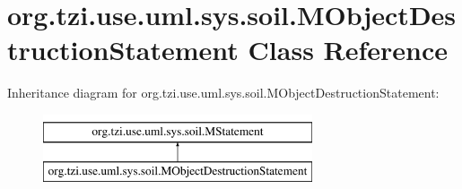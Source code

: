 \hypertarget{classorg_1_1tzi_1_1use_1_1uml_1_1sys_1_1soil_1_1_m_object_destruction_statement}{\section{org.\-tzi.\-use.\-uml.\-sys.\-soil.\-M\-Object\-Destruction\-Statement Class Reference}
\label{classorg_1_1tzi_1_1use_1_1uml_1_1sys_1_1soil_1_1_m_object_destruction_statement}
}
Inheritance diagram for org.\-tzi.\-use.\-uml.\-sys.\-soil.\-M\-Object\-Destruction\-Statement\-:\begin{figure}[H]
\begin{center}
\leavevmode
\includegraphics[height=2.000000cm]{classorg_1_1tzi_1_1use_1_1uml_1_1sys_1_1soil_1_1_m_object_destruction_statement}
\end{center}
\end{figure}

